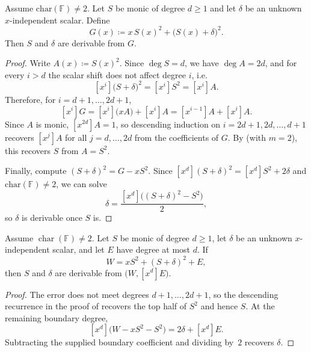 \begin{lemma}\label{lem:square-gadget}
    Assume $\mathrm{char}(\mathbb{F})\ne 2$.
    Let $S$ be monic of degree $d\ge 1$ and let $\delta$ be an unknown
    $x$-independent scalar.
    Define
    \[
      G(x)\coloneqq x\,S(x)^2 + \bigl(S(x)+\delta\bigr)^2.
    \]
    Then $S$ and $\delta$ are derivable from $G$.
\end{lemma}
\begin{proof}
    Write $A(x)\coloneqq S(x)^2$.
    Since $\deg S=d$, we have $\deg A=2d$, and for every $i>d$ the scalar shift does not affect degree $i$, i.e.
    \[
      [x^i]\bigl(S+\delta\bigr)^2=[x^i]S^2=[x^i]A.
    \]
    Therefore, for $i=d+1,\ldots,2d+1$,
    \[
      [x^i]G = [x^i]\bigl(xA\bigr) + [x^i]A = [x^{i-1}]A + [x^i]A.
    \]
    Since $A$ is monic, $[x^{2d}]A=1$, so descending induction on $i=2d+1,2d,\ldots,d+1$ recovers $[x^j]A$ for all $j=d,\ldots,2d$ from the coefficients of $G$.
    By  (with $m=2$), this recovers $S$ from $A=S^2$.

    Finally, compute $(S+\delta)^2 = G - xS^2$.
    Since $[x^d](S+\delta)^2 = [x^d]S^2 + 2\delta$ and $\mathrm{char}(\mathbb{F})\ne 2$, we can solve
    \[
      \delta=\frac{[x^d]\bigl((S+\delta)^2-S^2\bigr)}{2},
    \]
    so $\delta$ is derivable once $S$ is.
\end{proof}

\begin{lemma}
\label{lem:square-gadget-boundary}
Assume $\operatorname{char}(\mathbb F)\ne2$.  Let $S$ be monic of degree
$d\ge1$, let $\delta$ be an unknown $x$-independent scalar, and let $E$ have
degree at most $d$.  If
\[
 W=xS^2+(S+\delta)^2+E,
\]
then $S$ and $\delta$ are derivable from
$\bigl(W,[x^d]E\bigr)$.
\end{lemma}
\begin{proof}
The error does not meet degrees $d+1,\ldots,2d+1$, so the descending
recurrence in the proof of  recovers the top half of
$S^2$ and hence $S$.  At the remaining boundary degree,
\[
 [x^d]\bigl(W-xS^2-S^2\bigr)=2\delta+[x^d]E.
\]
Subtracting the supplied boundary coefficient and dividing by~$2$ recovers
$\delta$.
\end{proof}

